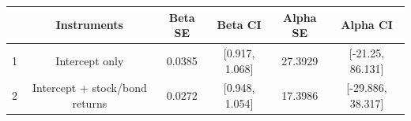 \begin{table}[ht]
\centering
\begin{tabular}{cccccc}
  \hline
 & Instruments & Beta SE & Beta CI & Alpha SE & Alpha CI \\ 
  \hline
1 & Intercept only & 0.0385 & [0.917, 1.068] & 27.3929 & [-21.25, 86.131] \\ 
  2 & Intercept + stock/bond returns & 0.0272 & [0.948, 1.054] & 17.3986 & [-29.886, 38.317] \\ 
   \hline
\end{tabular}
\end{table}

